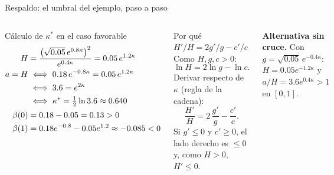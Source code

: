\documentclass[aspectratio=169,10pt,t]{beamer}
\begin{document}
\begin{frame}{Respaldo: el umbral del ejemplo, paso a paso}
\begin{columns}[T,onlytextwidth]
\begin{hoja}{Cálculo de $\kappa^{*}$ en el caso favorable}
\small
\vspace{-3mm}
\begin{align*}
H&=\frac{\bigl(\sqrt{0.05}\,e^{0.8\kappa}\bigr)^{2}}{e^{0.4\kappa}}
=0.05\,e^{1.2\kappa}\\
a=H&\iff 0.18\,e^{-0.8\kappa}=0.05\,e^{1.2\kappa}\\
&\iff 3.6=e^{2\kappa}\\
&\iff \kappa^{*}=\tfrac12\ln 3.6\approx0.640\\[.8mm]
\beta(0)&=0.18-0.05=0.13>0\\
\beta(1)&=0.18e^{-0.8}-0.05e^{1.2}\approx-0.085<0
\end{align*}
\vspace{-4mm}
\end{hoja}
\begin{hoja}{Por qué $H'/H=2g'/g-c'/c$}
\small
Como $H,g,c>0$:
\[\ln H=2\ln g-\ln c.\]
Derivar respecto de $\kappa$ (regla de la cadena):
\[\frac{H'}{H}=2\,\frac{g'}{g}-\frac{c'}{c}.\]
Si $g'\le 0$ y $c'\ge 0$, el lado derecho es $\le 0$ y, como $H>0$, $H'\le 0$.
\end{hoja}
\begin{plainbox}\footnotesize
\textbf{Alternativa sin cruce.} Con $g=\sqrt{0.05}\,e^{-0.4\kappa}$:
$H=0.05e^{-1.2\kappa}$ y $a/H=3.6e^{0.4\kappa}>1$ en $[0,1]$.
\end{plainbox}
\end{columns}
\end{frame}
\end{document}
